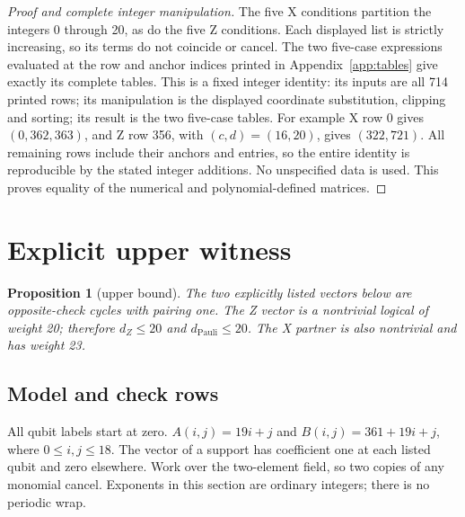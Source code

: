 \documentclass{article}
\newtheorem{proposition}{Proposition}
\begin{document}
\begin{proof}[Proof and complete integer manipulation]
  The five X conditions partition the integers 0 through 20, as do the five Z conditions. Each
  displayed list is strictly increasing, so its terms do not coincide or cancel. The two
  five-case expressions evaluated at the row and anchor indices printed in
  Appendix~\ref{app:tables} give exactly its complete tables. This is a fixed integer
  identity: its inputs are all 714 printed rows; its manipulation is the displayed coordinate
  substitution, clipping and sorting; its result is the two five-case tables. For example X row 0
  gives \((0, 362, 363)\), and Z row 356, with \((c,d) = (16,20)\), gives \((322, 721)\). All
  remaining rows include their anchors and entries, so the entire identity is reproducible by the
  stated integer additions. No unspecified data is used. This proves equality of the numerical
  and polynomial-defined matrices.
\end{proof}

\section{Explicit upper witness}\label{sec:witness}

\begin{proposition}[upper bound]\label{prop:witness}
  The two explicitly listed vectors below are opposite-check cycles with pairing one. The Z
  vector is a nontrivial logical of weight 20; therefore \(d_Z \le 20\) and
  \(d_{\text{Pauli}} \le 20\). The X partner is also nontrivial and has weight 23.
\end{proposition}

\subsection{Model and check rows}\label{sec:witness-model}

All qubit labels start at zero. \(A(i,j) = 19i+j\) and \(B(i,j) = 361+19i+j\), where
\(0 \le i,j \le 18\). The vector of a support has coefficient one at each listed qubit and zero
elsewhere. Work over the two-element field, so two copies of any monomial cancel. Exponents in
this section are ordinary integers; there is no periodic wrap.
\end{document}
